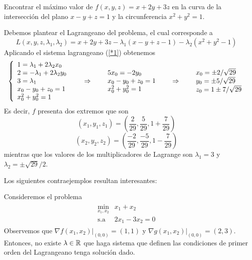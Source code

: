 \begin{ejemplo}
Encontrar el m\'aximo valor de $f(x,y,z)=x+2y+3z$ en la curva de la intersecci\'on del plano $x-y+z=1$ y la circunferencia $x^2+y^2=1$.

\begin{solucion}
Debemos plantear el Lagrangeano del problema, el cual corresponde a
$$L(x,y,z,\lambda_1,\lambda_2)=x+2y+3z - \lambda_1 (x-y+z-1) - \lambda_2 (x^2+y^2-1)$$
Aplicando el sistema lagrangeano (\ref{*1}) obtenemos
\[%
\begin{array}
[c]{lllll}%
\left\{
\begin{array}
[c]{l}%
1=\lambda_1 + 2\lambda_2 x_0 \\
2=-\lambda_1 + 2\lambda_2 y_0 \\
3 = \lambda_1 \\
x_0-y_0+z_0=1 \\
x_0^2 + y_0^2=1
\end{array}
\right.   & \quad\Rightarrow\quad &
\begin{array}
[c]{l}%
5x_0 = -2y_0 \\
x_0-y_0+z_0=1 \\
x_0^2 + y_0^2=1
\end{array}
& \quad\Rightarrow\quad &
\begin{array}
[c]{l}%
x_0=\pm 2/\sqrt{29}\\
y_0=\pm 5/\sqrt{29}\\
z_0=1\pm 7/\sqrt{29}
\end{array}
\end{array}
\]
Es decir, $f$ presenta dos extremos que son 
$$(x_1,y_1,z_1)=\left(\frac{2}{29},\frac{5}{29},1+\frac{7}{29}\right)$$
$$(x_2,y_2,z_2)=\left(\frac{-2}{29},\frac{-5}{29},1-\frac{7}{29}\right)$$ 
mientras que los valores de los multiplicadores de Lagrange son $\lambda_1 = 3$ y $\lambda_2 = \pm \sqrt{29}/2$.
\end{solucion}
\end{ejemplo}

Los siguientes contraejemplos resultan interesantes:

\begin{ejemplo} Consideremos el problema
\begin{eqnarray*}
\begin{array}{cc}
\displaystyle \min_{x_1,x_2} & x_1+x_2   \\
\text{s.a}  			 	 & 2x_1-3x_2=0
\end{array}
\end{eqnarray*}
Observemos que $\nabla f(x_1,x_2)|_{(0,0)}= (1,1)$ y $\nabla g(x_1,x_2)|_{(0,0)}=(2,3)$. Entonces, no existe $\lambda\in \mathbb{R}$ que haga sistema que definen las condiciones de primer orden del Lagrangeano tenga soluci\'on dado.
\end{ejemplo}

